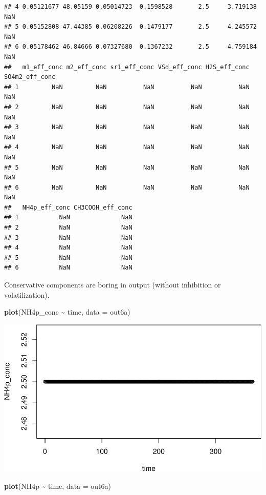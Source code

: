 \documentclass[
]{article}
\newenvironment{Shaded}{\begin{snugshade}}{\end{snugshade}}
\newcommand{\AttributeTok}[1]{\textcolor[rgb]{0.13,0.29,0.53}{#1}}
\newcommand{\FunctionTok}[1]{\textcolor[rgb]{0.13,0.29,0.53}{\textbf{#1}}}
\newcommand{\NormalTok}[1]{#1}
\newcommand{\SpecialCharTok}[1]{\textcolor[rgb]{0.81,0.36,0.00}{\textbf{#1}}}
\begin{document}
\begin{verbatim}
## 4 0.05121677 48.05159 0.05014723  0.1598528       2.5     3.719138         NaN
## 5 0.05152808 47.44385 0.06208226  0.1479177       2.5     4.245572         NaN
## 6 0.05178462 46.84666 0.07327680  0.1367232       2.5     4.759184         NaN
##   m1_eff_conc m2_eff_conc sr1_eff_conc VSd_eff_conc H2S_eff_conc SO4m2_eff_conc
## 1         NaN         NaN          NaN          NaN          NaN            NaN
## 2         NaN         NaN          NaN          NaN          NaN            NaN
## 3         NaN         NaN          NaN          NaN          NaN            NaN
## 4         NaN         NaN          NaN          NaN          NaN            NaN
## 5         NaN         NaN          NaN          NaN          NaN            NaN
## 6         NaN         NaN          NaN          NaN          NaN            NaN
##   NH4p_eff_conc CH3COOH_eff_conc
## 1           NaN              NaN
## 2           NaN              NaN
## 3           NaN              NaN
## 4           NaN              NaN
## 5           NaN              NaN
## 6           NaN              NaN
\end{verbatim}

Conservative components are boring in output (without inhibition or
volatilization).

\begin{Shaded}
\begin{Highlighting}[]
\FunctionTok{plot}\NormalTok{(NH4p\_conc }\SpecialCharTok{\textasciitilde{}}\NormalTok{ time, }\AttributeTok{data =}\NormalTok{ out6a)}
\end{Highlighting}
\end{Shaded}

\includegraphics{simple_demo_files/figure-latex/unnamed-chunk-40-1.pdf}

\begin{Shaded}
\begin{Highlighting}[]
\FunctionTok{plot}\NormalTok{(NH4p }\SpecialCharTok{\textasciitilde{}}\NormalTok{ time, }\AttributeTok{data =}\NormalTok{ out6a)}
\end{Highlighting}
\end{Shaded}
\end{document}
